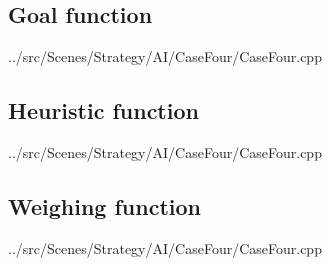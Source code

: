 \documentclass[11pt, a4paper]{report}
\begin{document}
\begin{appendices}
\subsection{Goal function}
\label{subsec:caseFourGoalFunction}

\linespread{0.8}

{../src/Scenes/Strategy/AI/CaseFour/CaseFour.cpp}
\linespread{1.5}
\pagebreak

\subsection{Heuristic function}
\label{subsec:caseFourHeuristicFunction}

\linespread{0.8}

{../src/Scenes/Strategy/AI/CaseFour/CaseFour.cpp}
\linespread{1.5}
\pagebreak

\subsection{Weighing function}
\label{subsec:caseFourWeighingFunction}

\linespread{0.8}

{../src/Scenes/Strategy/AI/CaseFour/CaseFour.cpp}
\linespread{1.5}
\pagebreak

\end{appendices}
\end{document}
